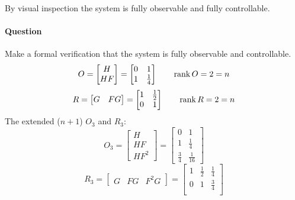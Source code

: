 \begin{exercise}
\begin{figure}[H]
    \end{figure}


    By visual inspection the system is fully observable and fully controllable.

    \paragraph{Question} Make a formal verification that the system is fully observable and controllable.
    \[
        O = \begin{bmatrix}
            H \\ HF
        \end{bmatrix} = \begin{bmatrix}
            0 & 1 \\
            1 & \frac{1}{4}
        \end{bmatrix}
        \qquad
        \operatorname*{rank} O = 2 = n
    \]
    \[
        R = \begin{bmatrix}
            G & FG
        \end{bmatrix} = \begin{bmatrix}
            1 & \frac{1}{2} \\
            0 & 1
        \end{bmatrix}
        \qquad
        \operatorname*{rank} R = 2 = n
    \]
    The extended ($n+1$) $O_3$ and $R_3$:
    \[
        O_3 = \begin{bmatrix}
            H \\ HF \\ HF^2
        \end{bmatrix} = \begin{bmatrix}
            0 & 1 \\
            1 & \frac{1}{4} \\
            \frac{3}{4} & \frac{1}{16}
        \end{bmatrix}
    \]
    \[
        R_3 = \begin{bmatrix}
            G & FG & F^2G
        \end{bmatrix} = \begin{bmatrix}
            1 & \frac{1}{2} & \frac{1}{4} \\
            0 & 1 & \frac{3}{4} \\
        \end{bmatrix}
    \]


\end{exercise}
